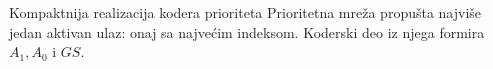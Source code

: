 \begin{frame}[label=03-s018]{Kompaktnija realizacija kodera prioriteta}
Prioritetna mreža propušta najviše jedan aktivan ulaz: onaj sa najvećim indeksom. Koderski deo iz njega formira \(A_1,A_0\) i \(GS\).
\par\vspace{3mm}
{\centering

\par}
\par\vspace{3mm}
\end{frame}
